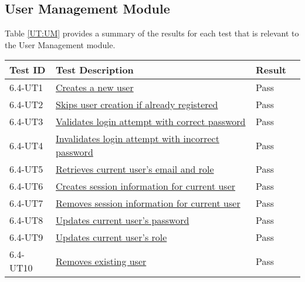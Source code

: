 \documentclass[12pt, titlepage]{article}
\begin{document}
\subsection{User Management Module}
Table \ref{UT:UM} provides a summary of the results for each test that is
relevant to the User Management module.
\begin{table}[H]
  \centering
  \begin{tabular}{|l|l|l|l|}
    \hline
    \textbf{Test ID} & \textbf{Test Description} & \textbf{Result}\\
    \hline
    6.4-UT1 & \href{https://github.com/SumanyaG/Alkalytics/blob/main/src/backend/test/userServiceTest.py}{Creates a new user} & Pass\\
    \hline
    6.4-UT2 & \href{https://github.com/SumanyaG/Alkalytics/blob/main/src/backend/test/userServiceTest.py}{Skips user creation if already registered} & Pass\\
    \hline
    6.4-UT3 & \href{https://github.com/SumanyaG/Alkalytics/blob/main/src/backend/test/userServiceTest.py}{Validates login attempt with correct password} & Pass \\
    \hline
    6.4-UT4 & \href{https://github.com/SumanyaG/Alkalytics/blob/main/src/backend/test/userServiceTest.py}{Invalidates login attempt with incorrect password} & Pass\\
    \hline
    6.4-UT5 & \href{https://github.com/SumanyaG/Alkalytics/blob/main/src/backend/test/userServiceTest.py}{Retrieves current user's email and role} & Pass \\
    \hline
    6.4-UT6 & \href{https://github.com/SumanyaG/Alkalytics/blob/main/src/backend/test/userServiceTest.py}{Creates session information for current user} & Pass\\
    \hline
    6.4-UT7 & \href{https://github.com/SumanyaG/Alkalytics/blob/main/src/backend/test/userServiceTest.py}{Removes session information for current user} & Pass\\
    \hline
    6.4-UT8 & \href{https://github.com/SumanyaG/Alkalytics/blob/main/src/backend/test/userServiceTest.py}{Updates current user's password} & Pass\\
    \hline
    6.4-UT9 & \href{https://github.com/SumanyaG/Alkalytics/blob/main/src/backend/test/userServiceTest.py}{Updates current user's role} & Pass\\
    \hline
    6.4-UT10 & \href{https://github.com/SumanyaG/Alkalytics/blob/main/src/backend/test/userServiceTest.py}{Removes existing user} & Pass\\

\end{tabular}
\end{table}
\end{document}
